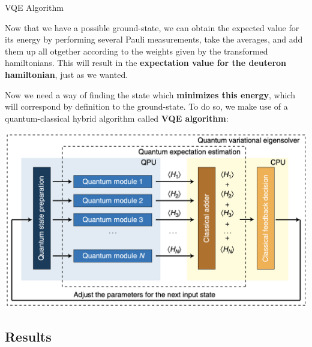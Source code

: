 \documentclass[9pt, handout, aspectratio=169]{beamer}		%
\begin{document}
	\begin{frame}{VQE Algorithm}

		Now that we have a possible ground-state, we can obtain the expected value for its energy by performing several Pauli measurements, take the averages, and add them up all otgether according to the weights given by the transformed hamiltonians. This will result in the \textbf{expectation value for the deuteron hamiltonian}, just as we wanted.

		\medskip

		Now we need a way of finding the state which \textbf{minimizes this energy}, which will correspond by definition to the ground-state. To do so, we make use of a quantum-classical hybrid algorithm called \textbf{VQE algorithm}:

		\begin{center}
			\includegraphics[height=.44\paperheight]{Figures/vqe_algorithm}
		\end{center}

	\end{frame}


	\subsection{Results}
\end{document}
